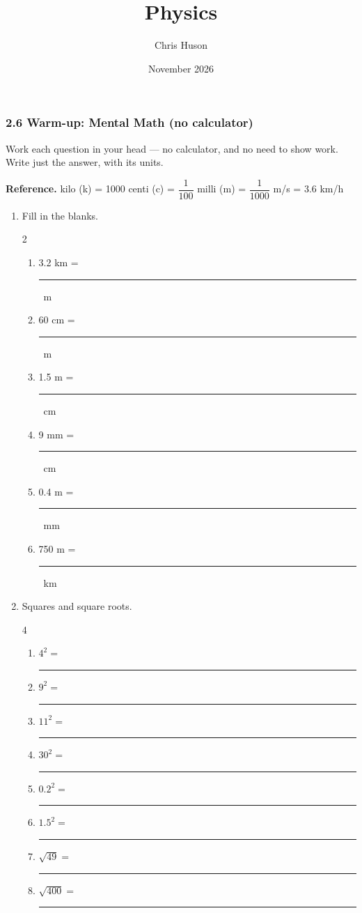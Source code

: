 \documentclass[12pt, twoside]{article}
\title{Physics}
\author{Chris Huson}
\date{November 2026}
\newcommand{\blank}[1][2.4cm]{\rule{#1}{0.4pt}}
\begin{document}
\subsubsection*{2.6 Warm-up: Mental Math (no calculator)}

Work each question in your head --- no calculator, and no need to show work. Write
just the answer, with its units.

\vspace{0.15cm}

\textbf{Reference.} \quad
kilo (k) = 1000 \quad centi (c) = $\dfrac{1}{100}$ \quad
milli (m) = $\dfrac{1}{1000}$  m/s = 3.6 km/h

\vspace{0.2cm}

\begin{enumerate}[itemsep=0.35cm]

\item Fill in the blanks.
  \begin{multicols}{2}
    \begin{enumerate}[itemsep=0.42cm]
      \item 3.2 km = \blank\ m
      \item 60 cm = \blank\ m
      \item 1.5 m = \blank\ cm
      \item 9 mm = \blank\ cm
      \item 0.4 m = \blank\ mm
      \item 750 m = \blank\ km
    \end{enumerate}
  \end{multicols}

\item Squares and square roots.
  \begin{multicols}{4}
    \begin{enumerate}[itemsep=0.5cm]
      \item $4^2 = $ \blank[1.1cm]
      \item $9^2 = $ \blank[1.1cm]
      \item $11^2 = $ \blank[1.1cm]
      \item $30^2 = $ \blank[1.1cm]
      \item $0.2^2 = $ \blank[1.1cm]
      \item $1.5^2 = $ \blank[1.1cm]
      \item $\sqrt{49} = $ \blank[1.1cm]
      \item $\sqrt{400} = $ \blank[1.1cm]
    \end{enumerate}
  \end{multicols}


\end{enumerate}
\end{document}
